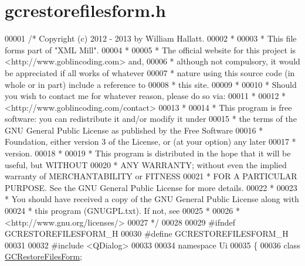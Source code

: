 \hypertarget{gcrestorefilesform_8h_source}{\section{gcrestorefilesform.\-h}
}

\begin{DoxyCode}
00001 \textcolor{comment}{/* Copyright (c) 2012 - 2013 by William Hallatt.}
00002 \textcolor{comment}{ *}
00003 \textcolor{comment}{ * This file forms part of "XML Mill".}
00004 \textcolor{comment}{ *}
00005 \textcolor{comment}{ * The official website for this project is <http://www.goblincoding.com> and,}
00006 \textcolor{comment}{ * although not compulsory, it would be appreciated if all works of whatever}
00007 \textcolor{comment}{ * nature using this source code (in whole or in part) include a reference to}
00008 \textcolor{comment}{ * this site.}
00009 \textcolor{comment}{ *}
00010 \textcolor{comment}{ * Should you wish to contact me for whatever reason, please do so via:}
00011 \textcolor{comment}{ *}
00012 \textcolor{comment}{ *                 <http://www.goblincoding.com/contact>}
00013 \textcolor{comment}{ *}
00014 \textcolor{comment}{ * This program is free software: you can redistribute it and/or modify it
       under}
00015 \textcolor{comment}{ * the terms of the GNU General Public License as published by the Free
       Software}
00016 \textcolor{comment}{ * Foundation, either version 3 of the License, or (at your option) any later}
00017 \textcolor{comment}{ * version.}
00018 \textcolor{comment}{ *}
00019 \textcolor{comment}{ * This program is distributed in the hope that it will be useful, but WITHOUT}
00020 \textcolor{comment}{ * ANY WARRANTY; without even the implied warranty of MERCHANTABILITY or
       FITNESS}
00021 \textcolor{comment}{ * FOR A PARTICULAR PURPOSE.  See the GNU General Public License for more
       details.}
00022 \textcolor{comment}{ *}
00023 \textcolor{comment}{ * You should have received a copy of the GNU General Public License along with}
00024 \textcolor{comment}{ * this program (GNUGPL.txt).  If not, see}
00025 \textcolor{comment}{ *}
00026 \textcolor{comment}{ *                    <http://www.gnu.org/licenses/>}
00027 \textcolor{comment}{ */}
00028 
00029 \textcolor{preprocessor}{#ifndef GCRESTOREFILESFORM\_H}
00030 \textcolor{preprocessor}{}\textcolor{preprocessor}{#define GCRESTOREFILESFORM\_H}
00031 \textcolor{preprocessor}{}
00032 \textcolor{preprocessor}{#include <QDialog>}
00033 
00034 \textcolor{keyword}{namespace }Ui
00035 \{
00036   \textcolor{keyword}{class }\hyperlink{class_g_c_restore_files_form}{GCRestoreFilesForm};

\end{DoxyCode}
